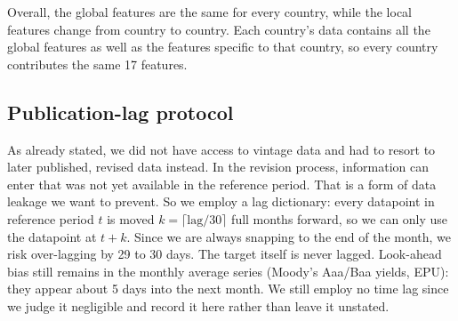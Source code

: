 Overall, the global features are the same for every country, while the local
features change from country to country. Each country's data contains all the
global features as well as the features specific to that country, so every
country contributes the same 17 features.

\subsection{Publication-lag protocol}
\label{sec:data:lags}

As already stated, we did not have access to vintage data and had to resort to later published, revised data instead. In the revision process, information can enter that was not yet available in the reference period. That is a form of data leakage we want to prevent. So we employ a lag dictionary: every datapoint in reference period $t$ is moved $k=\lceil \text{lag}/30\rceil$ full months forward, so we can only use the datapoint at $t + k$. Since we are always snapping to the end of the month, we risk over-lagging by 29 to 30 days. The target itself is never lagged. Look-ahead bias still remains in the monthly average series (Moody's Aaa/Baa yields, EPU): they appear about 5 days into the next month. We still employ no time lag since we judge
it negligible and record it here rather than leave it unstated.


